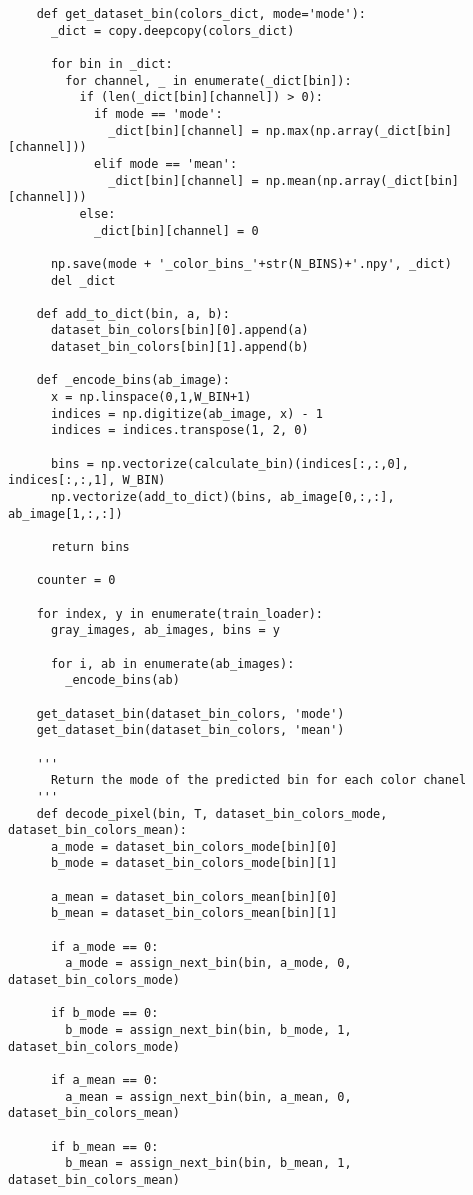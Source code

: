 \begin{longlisting}
\begin{verbatim}
    def get_dataset_bin(colors_dict, mode='mode'):
      _dict = copy.deepcopy(colors_dict)

      for bin in _dict:
        for channel, _ in enumerate(_dict[bin]):
          if (len(_dict[bin][channel]) > 0):
            if mode == 'mode':
              _dict[bin][channel] = np.max(np.array(_dict[bin][channel]))
            elif mode == 'mean':
              _dict[bin][channel] = np.mean(np.array(_dict[bin][channel]))
          else:
            _dict[bin][channel] = 0

      np.save(mode + '_color_bins_'+str(N_BINS)+'.npy', _dict)
      del _dict

    def add_to_dict(bin, a, b):
      dataset_bin_colors[bin][0].append(a)
      dataset_bin_colors[bin][1].append(b)

    def _encode_bins(ab_image):
      x = np.linspace(0,1,W_BIN+1)
      indices = np.digitize(ab_image, x) - 1
      indices = indices.transpose(1, 2, 0)
      
      bins = np.vectorize(calculate_bin)(indices[:,:,0], indices[:,:,1], W_BIN)
      np.vectorize(add_to_dict)(bins, ab_image[0,:,:], ab_image[1,:,:])

      return bins

    counter = 0

    for index, y in enumerate(train_loader):
      gray_images, ab_images, bins = y
        
      for i, ab in enumerate(ab_images):
        _encode_bins(ab)

    get_dataset_bin(dataset_bin_colors, 'mode')
    get_dataset_bin(dataset_bin_colors, 'mean')

    '''
      Return the mode of the predicted bin for each color chanel
    '''
    def decode_pixel(bin, T, dataset_bin_colors_mode, dataset_bin_colors_mean):
      a_mode = dataset_bin_colors_mode[bin][0]
      b_mode = dataset_bin_colors_mode[bin][1]

      a_mean = dataset_bin_colors_mean[bin][0]
      b_mean = dataset_bin_colors_mean[bin][1]

      if a_mode == 0:
        a_mode = assign_next_bin(bin, a_mode, 0, dataset_bin_colors_mode)

      if b_mode == 0:
        b_mode = assign_next_bin(bin, b_mode, 1, dataset_bin_colors_mode)

      if a_mean == 0:
        a_mean = assign_next_bin(bin, a_mean, 0, dataset_bin_colors_mean)

      if b_mean == 0:
        b_mean = assign_next_bin(bin, b_mean, 1, dataset_bin_colors_mean)
      

\end{verbatim}
\end{longlisting}
